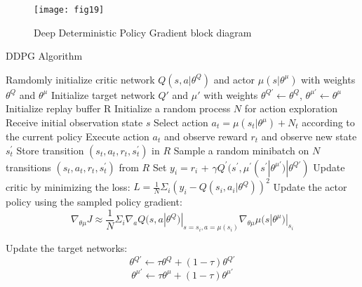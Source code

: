 \begin{figure}[h]
	\centering
	\texttt{[image: fig19]}
	\caption{Deep Deterministic Policy Gradient block diagram  }
	\label{fig:ddpg}
\end{figure}


\begin{algorithm}
	\caption{DDPG Algorithm}\label{alg:cap}
	\begin{algorithmic}[1]
		
		\STATE Ramdomly initialize critic network $Q(s,a|\theta^Q)$ and actor $\mu(s|\theta^\mu)$ with weights $\theta^Q$ and $\theta^\mu$
		\STATE Initialize target network $Q'$ and $\mu'$ with weights $\theta^{Q'} \gets \theta^Q$, $\theta^{\mu'} \gets \theta^\mu$
		\STATE Initialize replay buffer R
			\STATE Initialize a random process $N$ for action exploration
			\STATE Receive initial observation state $s$
				\STATE Select action $a_t = \mu(s_t|\theta^\mu) + N_t$ according to the current policy
				\STATE Execute action $a_t$ and observe reward $r_t$ and observe new state $s_{t}^{'}$
				\STATE Store transition $(s_t, a_t, r_t, s_{t}^{'})$ in $R$
				\STATE Sample a random minibatch on $N$ transitions $(s_t, a_t, r_t, s^{'}_{t})$ from $R$
				\STATE Set $y_i = r_i$ + $\gamma Q^{'}(s^{'}, \mu^{'}(s^{'}|\theta^{\mu'})|\theta^{Q'})$
				\STATE Update critic by minimizing the loss: $L = \frac{1}{N} \Sigma_i(y_i - Q(s_i, a_i|\theta^Q))^2$
				\STATE Update the actor policy using the sampled policy gradient:
					\[ \nabla_{\theta\mu} J \approx \frac{1}{N} \Sigma_i \nabla_a Q(s,a|\theta^Q)|_{s=s_i, a=\mu(s_i)} \nabla_{ \theta\mu} \mu(s|\theta^\mu)|_{s_i}\]
				
				\STATE Update the target networks:
					\[ \theta^{Q'}  \gets \tau\theta^Q + (1 - \tau)\theta^{Q'}\]
					\[ \theta^{\mu'}  \gets \tau\theta^\mu + (1 - \tau)\theta^{\mu'}\]
			\ENDFOR
		\ENDFOR
					
	


		
		
	\end{algorithmic}
\end{algorithm}

